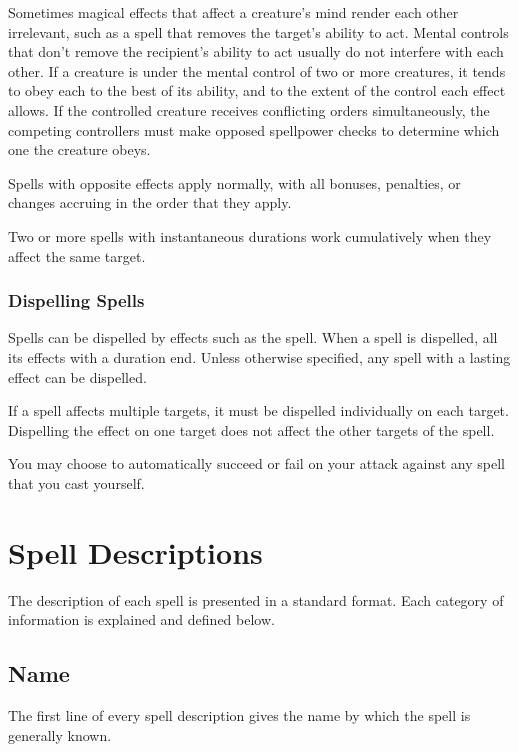              Sometimes magical effects that affect a creature's mind render each other irrelevant, such as a spell that removes the target's ability to act.
            Mental controls that don't remove the recipient's ability to act usually do not interfere with each other.
            If a creature is under the mental control of two or more creatures, it tends to obey each to the best of its ability, and to the extent of the control each effect allows.
            If the controlled creature receives conflicting orders simultaneously, the competing controllers must make opposed spellpower checks to determine which one the creature obeys.

             Spells with opposite effects apply normally, with all bonuses, penalties, or changes accruing in the order that they apply.

             Two or more spells with instantaneous durations work cumulatively when they affect the same target.

        \subsubsection{Dispelling Spells}\label{Dispelling Spells}
            Spells can be dispelled by effects such as the  spell.
            When a spell is dispelled, all its effects with a duration end.
            Unless otherwise specified, any spell with a lasting effect can be dispelled.

            If a spell affects multiple targets, it must be dispelled individually on each target.
            Dispelling the effect on one target does not affect the other targets of the spell.

            You may choose to automatically succeed or fail on your attack against any spell that you cast yourself.

\section{Spell Descriptions}
    The description of each spell is presented in a standard format.
    Each category of information is explained and defined below.

    \subsection{Name}
        The first line of every spell description gives the name by which the spell is generally known.

